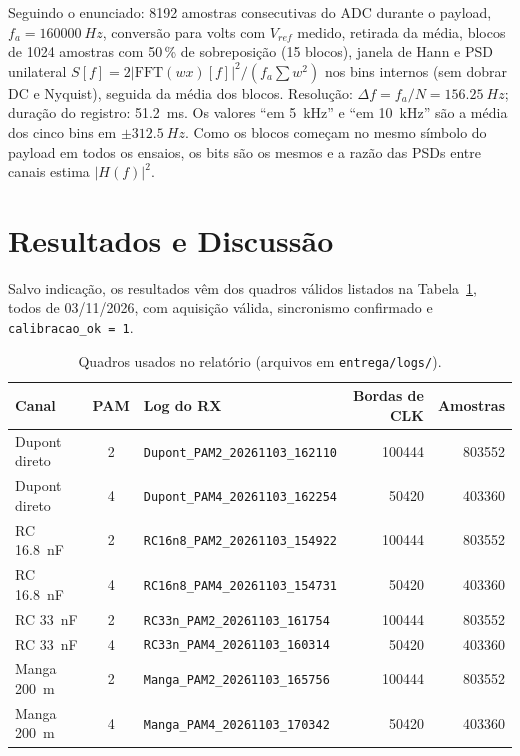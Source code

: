 \documentclass[12pt,a4paper]{article}
\begin{document}
Seguindo o enunciado: \num{8192} amostras consecutivas do ADC durante o payload, $f_a =
\SI{160000}{Hz}$, conversão para volts com $V_{ref}$ medido, retirada da média, blocos de
\num{1024} amostras com 50\,\% de sobreposição (15 blocos), janela de Hann e PSD unilateral
$S[f] = 2|\mathrm{FFT}(wx)[f]|^2/(f_a\sum w^2)$ nos bins internos (sem dobrar DC e Nyquist),
seguida da média dos blocos. Resolução: $\Delta f = f_a/N = \SI{156,25}{Hz}$; duração do registro:
\SI{51,2}{ms}. Os valores ``em \SI{5}{kHz}'' e ``em \SI{10}{kHz}'' são a média dos cinco bins em
$\pm\SI{312,5}{Hz}$. Como os blocos começam no mesmo símbolo do payload em todos os ensaios, os bits
são os mesmos e a razão das PSDs entre canais estima $|H(f)|^2$.

\section{Resultados e Discussão}

Salvo indicação, os resultados vêm dos quadros válidos listados na Tabela~\ref{tab:logs}, todos
de 03/11/2026, com aquisição válida, sincronismo confirmado e \texttt{calibracao\_ok\,=\,1}.

\begin{table}[H]
\centering
\caption{Quadros usados no relatório (arquivos em \nolinkurl{entrega/logs/}).}
\label{tab:logs}
\small
\begin{tabular}{l c l r r}
\toprule
Canal & PAM & Log do RX & Bordas de CLK & Amostras \\
\midrule
Dupont direto & 2 & \texttt{Dupont\_PAM2\_20261103\_162110} & \num{100444} & \num{803552} \\
Dupont direto & 4 & \texttt{Dupont\_PAM4\_20261103\_162254} & \num{50420} & \num{403360} \\
RC \SI{16,8}{nF} & 2 & \texttt{RC16n8\_PAM2\_20261103\_154922} & \num{100444} & \num{803552} \\
RC \SI{16,8}{nF} & 4 & \texttt{RC16n8\_PAM4\_20261103\_154731} & \num{50420} & \num{403360} \\
RC \SI{33}{nF} & 2 & \texttt{RC33n\_PAM2\_20261103\_161754} & \num{100444} & \num{803552} \\
RC \SI{33}{nF} & 4 & \texttt{RC33n\_PAM4\_20261103\_160314} & \num{50420} & \num{403360} \\
Manga \SI{200}{m} & 2 & \texttt{Manga\_PAM2\_20261103\_165756} & \num{100444} & \num{803552} \\
Manga \SI{200}{m} & 4 & \texttt{Manga\_PAM4\_20261103\_170342} & \num{50420} & \num{403360} \\
\bottomrule
\end{tabular}
\end{table}
\end{document}
